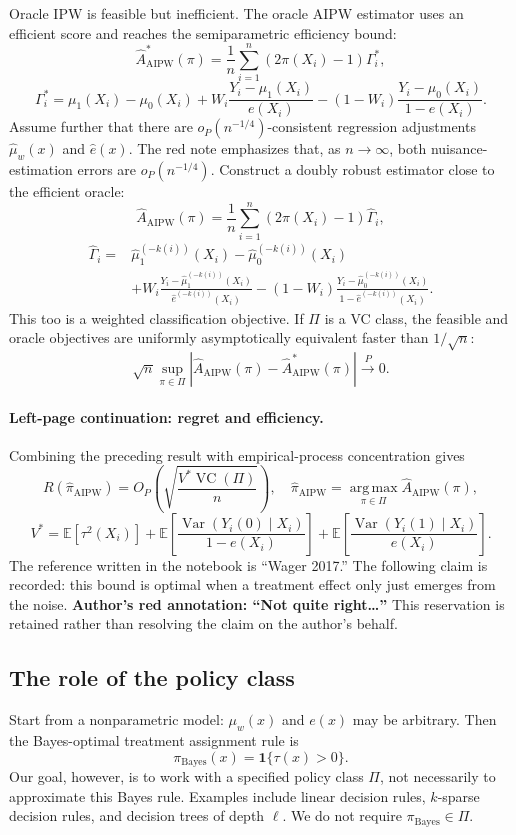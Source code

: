 Oracle IPW is feasible but inefficient. The oracle AIPW estimator uses an efficient score and reaches the semiparametric efficiency bound:
\[
 \widehat A^*_{\mathrm{AIPW}}(\pi)
 =\frac1n\sum_{i=1}^n(2\pi(X_i)-1)\Gamma_i^*,
\]
\[
 \Gamma_i^*=\mu_1(X_i)-\mu_0(X_i)
 +W_i\frac{Y_i-\mu_1(X_i)}{e(X_i)}
 -(1-W_i)\frac{Y_i-\mu_0(X_i)}{1-e(X_i)}.
\]
Assume further that there are $o_P(n^{-1/4})$-consistent regression adjustments $\widehat\mu_w(x)$ and $\widehat e(x)$. The red note emphasizes that, as $n\to\infty$, both nuisance-estimation errors are $o_P(n^{-1/4})$. Construct a doubly robust estimator close to the efficient oracle:
\[
 \widehat A_{\mathrm{AIPW}}(\pi)
 =\frac1n\sum_{i=1}^n(2\pi(X_i)-1)\widehat\Gamma_i,
\]
\begin{align*}
 \widehat\Gamma_i={}&\widehat\mu_1^{(-k(i))}(X_i)
 -\widehat\mu_0^{(-k(i))}(X_i)\\
 &+W_i\frac{Y_i-\widehat\mu_1^{(-k(i))}(X_i)}
 {\widehat e^{(-k(i))}(X_i)}
 -(1-W_i)\frac{Y_i-\widehat\mu_0^{(-k(i))}(X_i)}
 {1-\widehat e^{(-k(i))}(X_i)}.
\end{align*}
This too is a weighted classification objective. If $\Pi$ is a VC class, the feasible and oracle objectives are uniformly asymptotically equivalent faster than $1/\sqrt n$:
\[
 \sqrt n\sup_{\pi\in\Pi}
 \left|\widehat A_{\mathrm{AIPW}}(\pi)
 -\widehat A^*_{\mathrm{AIPW}}(\pi)\right|
 \xrightarrow{P}0.\tag{11.17}
\]

\paragraph{Left-page continuation: regret and efficiency.}
Combining the preceding result with empirical-process concentration gives
\[
 R(\widehat\pi_{\mathrm{AIPW}})
 =O_P\left(\sqrt{\frac{V^*\operatorname{VC}(\Pi)}n}\right),
 \quad
 \widehat\pi_{\mathrm{AIPW}}
 =\operatorname*{arg\,max}_{\pi\in\Pi}\widehat A_{\mathrm{AIPW}}(\pi),
\]
\[
 V^*=\mathbb E[\tau^2(X_i)]
 +\mathbb E\left[\frac{\operatorname{Var}(Y_i(0)\mid X_i)}{1-e(X_i)}\right]
 +\mathbb E\left[\frac{\operatorname{Var}(Y_i(1)\mid X_i)}{e(X_i)}\right].
\]
The reference written in the notebook is ``Wager 2017.'' The following claim is recorded: this bound is optimal when a treatment effect only just emerges from the noise. \textbf{Author's red annotation: ``Not quite right\ldots''} This reservation is retained rather than resolving the claim on the author's behalf.

\subsection{The role of the policy class}
Start from a nonparametric model: $\mu_w(x)$ and $e(x)$ may be arbitrary. Then the Bayes-optimal treatment assignment rule is
\[
 \pi_{\mathrm{Bayes}}(x)=\mathbf1\{\tau(x)>0\}.
\]
Our goal, however, is to work with a specified policy class $\Pi$, not necessarily to approximate this Bayes rule. Examples include linear decision rules, $k$-sparse decision rules, and decision trees of depth $\ell$. We do not require $\pi_{\mathrm{Bayes}}\in\Pi$.

